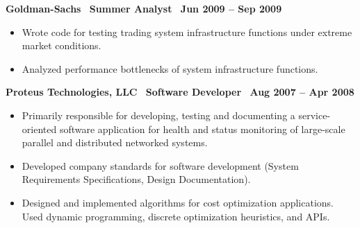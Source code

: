 \textbf{Goldman-Sachs$\>\>\>\>$Summer Analyst$\>\>\>\>$Jun 2009 – Sep 2009}
\vspace*{-0.0in}
\begin{itemize}
\item Wrote code for testing trading system infrastructure functions under extreme market conditions.
\item Analyzed performance bottlenecks of system infrastructure functions.
\end{itemize}

\textbf{Proteus Technologies, LLC$\>\>\>\>$Software Developer$\>\>\>\>$Aug 2007 – Apr 2008}
\vspace*{-0.0in}
\begin{itemize} 
\item Primarily responsible for developing, testing and documenting a service-oriented software application for health and status monitoring  of large-scale parallel and distributed networked systems.
\item Developed company standards for software development (System Requirements Specifications, Design Documentation). 
\item Designed and implemented algorithms for cost optimization applications. Used dynamic programming, discrete optimization heuristics, and APIs.
\end{itemize}
